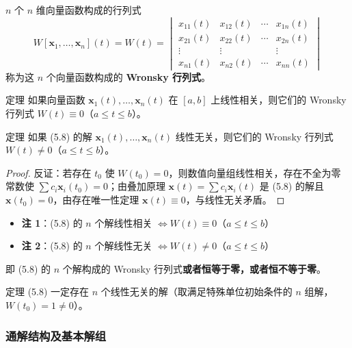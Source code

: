 $n$ 个 $n$ 维向量函数构成的行列式
$$W[\mathbf{x}_1, \ldots, \mathbf{x}_n](t) = W(t) = \begin{vmatrix} x_{11}(t) & x_{12}(t) & \cdots & x_{1n}(t) \\ x_{21}(t) & x_{22}(t) & \cdots & x_{2n}(t) \\ \vdots & \vdots & & \vdots \\ x_{n1}(t) & x_{n2}(t) & \cdots & x_{nn}(t) \end{vmatrix}$$
称为这 $n$ 个向量函数构成的 \textbf{Wronsky 行列式}。

\begin{myTheorem}{定理}
如果向量函数 $\mathbf{x}_1(t), \ldots, \mathbf{x}_n(t)$ 在 $[a,b]$ 上线性相关，则它们的 Wronsky 行列式 $W(t) \equiv 0$（$a \le t \le b$）。
\end{myTheorem}

\begin{myTheorem}{定理}
如果 (5.8) 的解 $\mathbf{x}_1(t), \ldots, \mathbf{x}_n(t)$ 线性无关，则它们的 Wronsky 行列式 $W(t) \neq 0$（$a \le t \le b$）。
\end{myTheorem}

\begin{proof}
反证：若存在 $t_0$ 使 $W(t_0) = 0$，则数值向量组线性相关，存在不全为零常数使 $\sum c_i\mathbf{x}_i(t_0) = 0$；由叠加原理 $\mathbf{x}(t) = \sum c_i\mathbf{x}_i(t)$ 是 (5.8) 的解且 $\mathbf{x}(t_0) = 0$，由存在唯一性定理 $\mathbf{x}(t) \equiv 0$，与线性无关矛盾。
\end{proof}

\begin{remark}
\begin{itemize}
    \item \textbf{注 1}：(5.8) 的 $n$ 个解线性相关 $\iff W(t) \equiv 0$（$a \le t \le b$）
    \item \textbf{注 2}：(5.8) 的 $n$ 个解线性无关 $\iff W(t) \neq 0$（$a \le t \le b$）
\end{itemize}
即 (5.8) 的 $n$ 个解构成的 Wronsky 行列式\textbf{或者恒等于零，或者恒不等于零}。
\end{remark}

\begin{myTheorem}{定理}
(5.8) 一定存在 $n$ 个线性无关的解（取满足特殊单位初始条件的 $n$ 组解，$W(t_0) = 1 \neq 0$）。
\end{myTheorem}

\subsubsection{通解结构及基本解组}


